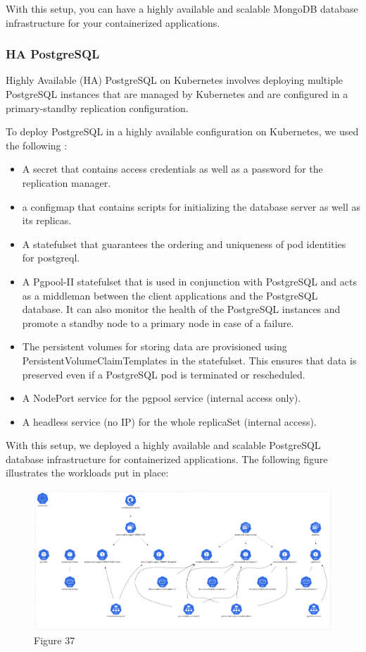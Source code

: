 With this setup, you can have a highly available and scalable MongoDB database infrastructure for your containerized applications. 

 
\subsubsection{HA PostgreSQL }

Highly Available (HA) PostgreSQL on Kubernetes involves deploying multiple PostgreSQL instances that are managed by Kubernetes and are configured in a primary-standby replication configuration.  

To deploy PostgreSQL in a highly available configuration on Kubernetes, we used the following : 
\begin{itemize}[label={--}]
\item A secret that contains access credentials as well as a password for the replication manager. 
\item a configmap that contains scripts for initializing the database server as well as its replicas. 
\item A statefulset that guarantees the ordering and uniqueness of pod identities for postgreql. 
\item A Pgpool-II statefulset that is used in conjunction with PostgreSQL and acts as a middleman between the client applications and the PostgreSQL database. It can also monitor the health of the PostgreSQL instances and promote a standby node to a primary node in case of a failure. 
\item The persistent volumes for storing data are provisioned using PersistentVolumeClaimTemplates in the statefulset. This ensures that data is preserved even if a PostgreSQL pod is terminated or rescheduled. 
\item A NodePort service for the pgpool service (internal access only). 
\item  A headless service (no IP) for the whole replicaSet (internal access). 
\end{itemize}

With this setup, we deployed a highly available and scalable PostgreSQL database infrastructure for containerized applications. The following figure illustrates the workloads put in place: 

\begin{figure}[H]\centering
\includegraphics[width=1.0\textwidth,angle=00]{assets/f37.png}
\caption{Figure 37 }
\label{fig:f37}
\end{figure}

